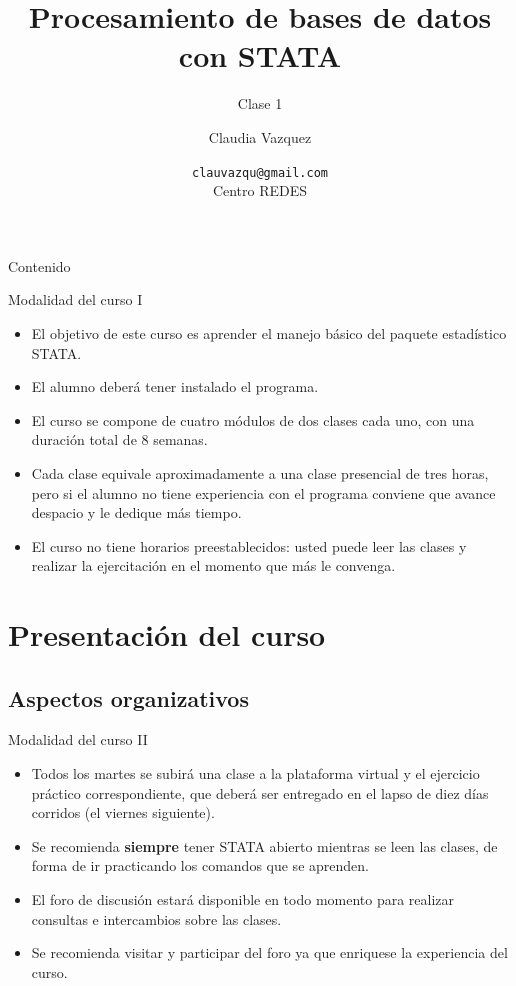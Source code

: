 \documentclass{beamer}
\title[Clase 1]{Procesamiento de bases de datos con STATA}
\subtitle{Clase 1}
\author{Claudia Vazquez}
\date[]{\texttt{clauvazqu@gmail.com}\\Centro REDES}
\begin{document}
\begin{frame}
  \titlepage
\end{frame}

\begin{frame}{Contenido}
  \tableofcontents
 \end{frame}




\begin{frame}{Modalidad del curso I}
\begin{itemize}
\item El objetivo de este curso es aprender el manejo básico del paquete estadístico STATA.
\item El alumno deberá tener instalado el programa.  
\item El curso se compone de cuatro módulos de dos clases cada uno, con una duración total de 8 semanas.
\item Cada clase equivale aproximadamente a una clase presencial de tres horas, pero si el alumno no tiene experiencia con el programa conviene que avance despacio y le dedique más tiempo.
 \item El curso no tiene horarios preestablecidos: usted puede leer las clases y realizar la ejercitación en el momento que más le convenga.
\end{itemize}
\end{frame} 

\section{Presentación del curso}
\subsection{Aspectos organizativos}
 
 \begin{frame}{Modalidad del curso II}
\begin{itemize}
\item Todos los martes se subirá una clase a la plataforma virtual y el ejercicio práctico correspondiente, que deberá ser entregado en el lapso de diez días corridos (el viernes siguiente).
\item Se recomienda \textbf{siempre} tener STATA abierto mientras se leen las clases, de forma de ir practicando los comandos que se aprenden.
\item El foro de discusión estará disponible en todo momento para realizar consultas e intercambios sobre las clases. 
\item Se recomienda visitar y participar del foro ya que enriquese la experiencia del curso. 
\end{itemize}
\end{frame}
\end{document}
